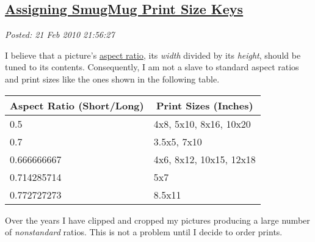 %

\subsection*{\href{https://bakerjd99.wordpress.com/2010/02/21/assigning-smugmug-print-size-keys/}{Assigning SmugMug Print Size Keys}}


\noindent\emph{Posted: 21 Feb 2010 21:56:27}
\vspace{6pt}

I believe that a picture's
\href{http://en.wikipedia.org/wiki/Aspect\_ratio\_(image)}{aspect
ratio}, its \emph{width} divided by its \emph{height}, should be tuned
to its contents. Consequently, I am not a slave to standard aspect
ratios and print sizes like the ones shown in the following table.

%
%
%
%
%
%
%
%
%
%
%

\begin{center}
\begin{tabular}{|l|p{}|} \hline
  \multicolumn{1}{|c|}{\textbf{Aspect Ratio (Short/Long)}}  &
  \multicolumn{1}{|c|}{\textbf{Print Sizes (Inches)}} \\ \hline  
   0.5              & 4x8, 5x10, 8x16, 10x20   \\ \hline
   0.7              & 3.5x5, 7x10              \\ \hline
   0.666666667      & 4x6, 8x12, 10x15, 12x18  \\ \hline
   0.714285714      & 5x7                      \\ \hline
   0.772727273      & 8.5x11                   \\ \hline
\end{tabular}
\end{center}


Over the years I have clipped and cropped my pictures producing a large
number of \emph{nonstandard} ratios. This is not a problem until I
decide to order prints.

